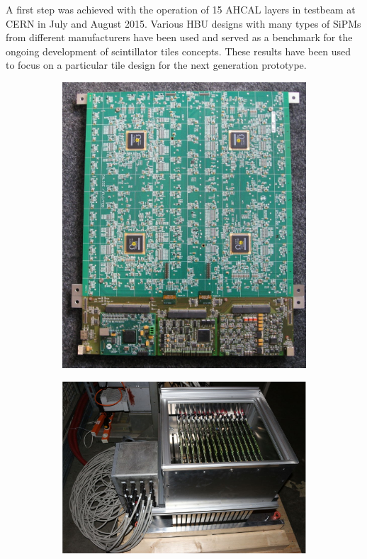 A first step was achieved with the operation of 15 AHCAL layers in testbeam at CERN in July and August 2015. Various HBU designs with many types of SiPMs from different manufacturers have been used and served as a benchmark for the ongoing development of scintillator tiles concepts. These results have been used to focus on a particular tile design for the next generation prototype.
\begin{figure}[htbp!]
  \centering
  \begin{subfigure}[t]{0.37\textwidth}
    \includegraphics[width=1.\linewidth]{chap3/fig/CALICE_AHCAL_20120323.jpg}
    \caption{} \label{fig:AHCALHBU}
  \end{subfigure}
  \hfill
  \begin{subfigure}[t]{0.61\textwidth}
    \includegraphics[width=1.\linewidth]{chap3/fig/small_HCAL_stack.png}

\end{subfigure}
\end{figure}
